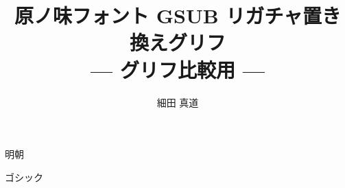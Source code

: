 \documentclass[dvipdfmx]{jsarticle}
\title{原ノ味フォント GSUB リガチャ置き換えグリフ \\
--- グリフ比較用 ---}
\author{細田 真道}
\begin{document}
\maketitle

\clearpage
\parindent=0pt
\fboxsep=0pt

\mcfamily
{\Large 明朝}

\testAll

\clearpage

\gtfamily
{\Large ゴシック}

\testAll
\end{document}
